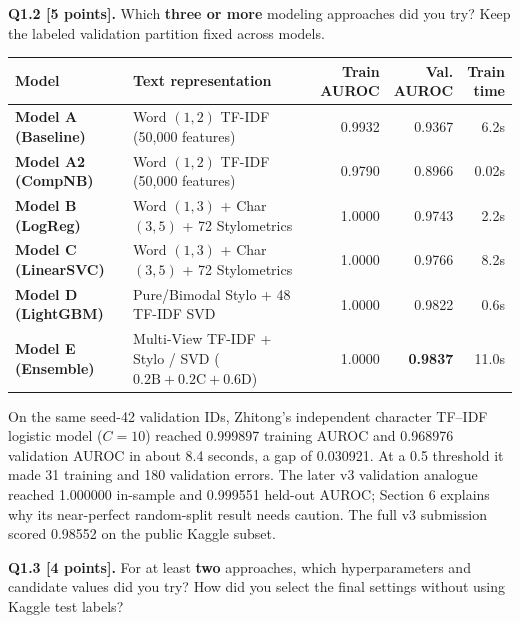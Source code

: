\documentclass[11pt,letterpaper]{article}
\begin{document}
\vspace{6pt}
\textbf{Q1.2 [5 points].} Which \textbf{three or more} modeling approaches did you try? Keep the labeled validation partition fixed across models.

\vspace{3pt}
{\small
\renewcommand{\arraystretch}{1.20}
\begin{tabularx}{\textwidth}{@{}l >{\raggedright\arraybackslash}X rrr@{}}
\toprule
\textbf{Model} & \textbf{Text representation} & \shortstack{\textbf{Train}\\\textbf{AUROC}} & \shortstack{\textbf{Val.}\\\textbf{AUROC}} & \shortstack{\textbf{Train}\\\textbf{time}} \\
\midrule
\textbf{Model A (Baseline)} & Word $(1,2)$ TF-IDF (50,000 features) & 0.9932 & 0.9367 & 6.2s \\
\textbf{Model A2 (CompNB)} & Word $(1,2)$ TF-IDF (50,000 features) & 0.9790 & 0.8966 & 0.02s \\
\textbf{Model B (LogReg)} & Word $(1,3)$ + Char $(3,5)$ + 72 Stylometrics & 1.0000 & 0.9743 & 2.2s \\
\textbf{Model C (LinearSVC)} & Word $(1,3)$ + Char $(3,5)$ + 72 Stylometrics & 1.0000 & 0.9766 & 8.2s \\
\textbf{Model D (LightGBM)} & 72 Pure/Bimodal Stylo + 48 TF-IDF SVD & 1.0000 & 0.9822 & 0.6s \\
\textbf{Model E (Ensemble)} & Multi-View TF-IDF + Stylo / SVD ($0.2\text{B} + 0.2\text{C} + 0.6\text{D}$) & 1.0000 & \textbf{0.9837} & 11.0s \\
\bottomrule
\end{tabularx}
}

On the same seed-42 validation IDs, Zhitong's independent character TF--IDF logistic model ($C=10$) reached 0.999897 training AUROC and 0.968976 validation AUROC in about 8.4 seconds, a gap of 0.030921. At a 0.5 threshold it made 31 training and 180 validation errors. The later v3 validation analogue reached 1.000000 in-sample and 0.999551 held-out AUROC; Section 6 explains why its near-perfect random-split result needs caution. The full v3 submission scored 0.98552 on the public Kaggle subset.

\newpage

\textbf{Q1.3 [4 points].} For at least \textbf{two} approaches, which hyperparameters and candidate values did you try? How did you select the final settings without using Kaggle test labels?
\end{document}
